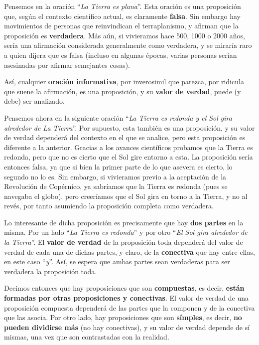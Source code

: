 Pensemos en la oración ``\textit{La Tierra es plana}''. Esta oración es una
proposición que, según el contexto cientifico actual, es claramente
\textbf{falsa}. Sin embargo hay movimientos de personas que reinvindican el
terraplanismo, y afirman que la proposición es \textbf{verdadera}. Más aún, si
vivieramos hace 500, 1000 o 2000 años, sería una afirmación considerada
generalmente como verdadera, y se miraría raro a quien dijera que es falsa
(incluso en algunas épocas, varias personas serían asesinadas por afirmar
semejantes cosas).

Así, cualquier \textbf{oración informativa}, por inverosimil que parezca, por
ridicula que suene la afirmación, es una proposición, y su \textbf{valor de
verdad}, puede (y debe) ser analizado.

Pensemos ahora en la siguiente oración ``\textit{La Tierra es redonda y el Sol
gira alrededor de La Tierra}''. Por supuesto, esta también es una proposición, y
su valor de verdad dependerá del contexto en el que se analice, pero esta
proposición es diferente a la anterior. Gracias a los avances científicos
probamos que la Tierra es redonda, pero que no es cierto que el Sol gire entorno
a esta. La proposición sería entonces falsa, ya que si bien la primer parte de
lo que asevera es cierto, lo segundo no lo es. Sin embargo, si vivieramos previo
a la aceptación de la Revolución de Copérnico, ya sabríamos que la Tierra es
redonda (pues se navegaba el globo), pero creeríamos que el Sol gira en torno a
la Tierra, y no al revés, por tanto asumiendo la proposición completa como
verdadera.

Lo interesante de dicha proposición es precisamente que hay \textbf{dos partes}
en la misma. Por un lado ``\textit{La Tierra es redonda}'' y por otro
``\textit{El Sol gira alrededor de la Tierra}''. El \textbf{valor de verdad} de
la proposición toda dependerá del valor de verdad de cada una de dichas partes,
y claro, de la \textbf{conectiva} que hay entre ellas, en este caso
``\textit{y}''. Así, se espera que ambas partes sean verdaderas para ser
verdadera la proposición toda.

Decimos entonces que hay proposiciones que son \textbf{compuestas}, es decir,
\textbf{están formadas por otras proposiciones y conectivas}. El valor de verdad
de una proposición compuesta dependerá de las partes que la componen y de la
conectiva que las asocia. Por otro lado, hay proposiciones que son
\textbf{símples}, es decir, \textbf{no pueden dividirse más} (no hay
conectivas), y su valor de verdad depende de sí mismas, una vez que son
contrastadas con la realidad.

